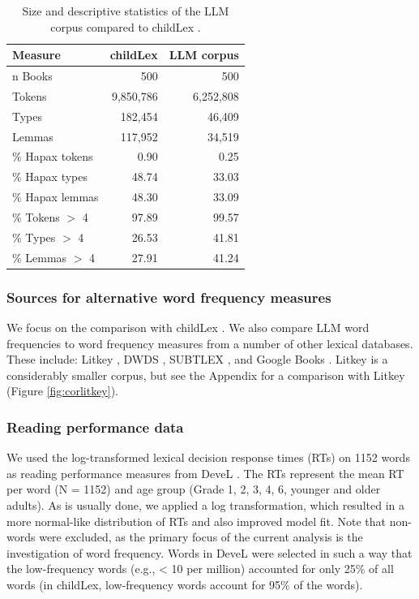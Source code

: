 \documentclass[doc, a4paper, anonymous]{apa7}
\begin{document}
\begin{table}[ht]
\caption{Size and descriptive statistics of the LLM corpus compared to childLex \citep{schroeder_childlex_2015}.}
\centering
\begin{tabular}{lrr}
  \hline
Measure & childLex & LLM corpus \\ 
  \hline
n Books & 500 & 500 \\ 
  Tokens & 9,850,786 & 6,252,808 \\ 
  Types & 182,454 & 46,409 \\ 
  Lemmas & 117,952 & 34,519 \\ 
  \% Hapax tokens & 0.90 & 0.25 \\ 
  \% Hapax types & 48.74 & 33.03 \\ 
  \% Hapax lemmas & 48.30 & 33.09 \\ 
  \% Tokens $>$ 4 & 97.89 & 99.57 \\ 
  \% Types $>$ 4 & 26.53 & 41.81 \\ 
  \% Lemmas $>$ 4 & 27.91 & 41.24 \\ 
   \hline
\end{tabular}
\label{freqComp}
\end{table}


\subsubsection*{Sources for alternative word frequency measures}

We focus on the comparison with childLex \citep{schroeder_childlex_2015}. We also compare LLM word frequencies to word frequency measures from a number of other lexical databases. These include: Litkey \citep{laarmann-quante_litkey_2019}, DWDS \citep{heister_dlexdb_2011}, SUBTLEX \citep{brysbaert_word_2011}, and Google Books \citep{brysbaert_impact_2016}. Litkey is a considerably smaller corpus, but see the Appendix for a comparison with Litkey (Figure \ref{fig:corlitkey}). 


\subsubsection*{Reading performance data}

We used the log-transformed lexical decision response times (RTs) on 1152 words as reading performance measures from DeveL \citep{schroter_developmental_2017}. The RTs represent the mean RT per word (N = 1152) and age group (Grade 1, 2, 3, 4, 6, younger and older adults). As is usually done, we applied a log transformation, which resulted in a more normal-like distribution of RTs and also improved model fit. Note that non-words were excluded, as the primary focus of the current analysis is the investigation of word frequency. Words in DeveL were selected in such a way that the low-frequency words (e.g., < 10 per million) accounted for only 25\% of all words (in childLex, low-frequency words account for 95\% of the words).  
\end{document}
